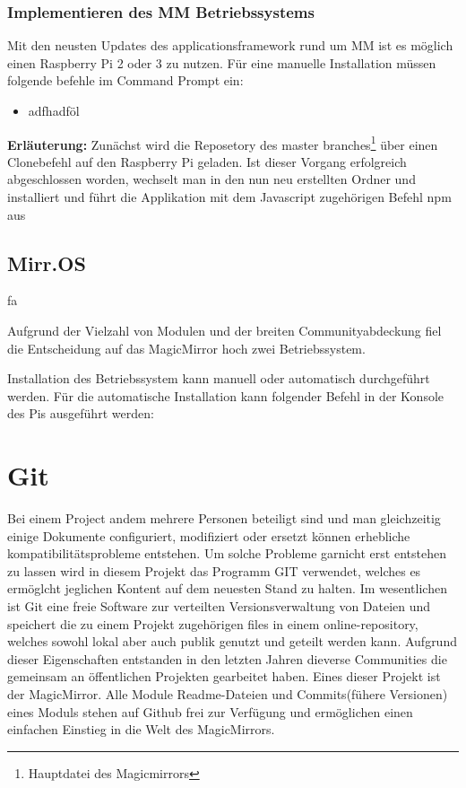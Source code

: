 \documentclass[12pt,a4paper]{report}
\begin{document}
\subsubsection{Implementieren des MM Betriebssystems}
Mit den neusten Updates des applicationsframework rund um MM ist es möglich einen Raspberry Pi 2 oder 3 zu nutzen. Für eine manuelle Installation müssen folgende befehle im Command Prompt ein:
 
 \begin{itemize}
 \item adfhadföl
 \end{itemize}
\textbf{Erläuterung:}
Zunächst wird die Reposetory des master branches\footnote{Hauptdatei des Magicmirrors} über einen Clonebefehl auf den Raspberry Pi geladen. Ist dieser Vorgang erfolgreich abgeschlossen worden, wechselt man in den nun neu erstellten Ordner und installiert und führt die Applikation mit dem Javascript zugehörigen Befehl npm aus 

\subsection*{Mirr.OS}
fa


Aufgrund der Vielzahl von Modulen und der breiten Communityabdeckung fiel die Entscheidung auf das MagicMirror hoch zwei Betriebssystem. 


Installation des Betriebssystem kann manuell oder automatisch durchgeführt werden. 
Für die automatische Installation kann folgender Befehl in der Konsole des Pis ausgeführt werden:

\section{Git}
Bei einem Project andem mehrere Personen beteiligt sind und man gleichzeitig einige Dokumente configuriert, modifiziert oder ersetzt können erhebliche kompatibilitätsprobleme entstehen. Um solche Probleme garnicht erst entstehen zu lassen wird in diesem Projekt das Programm GIT verwendet, welches es ermöglcht jeglichen Kontent auf dem neuesten Stand zu halten. Im wesentlichen ist Git eine freie Software zur verteilten Versionsverwaltung von Dateien und speichert die zu einem Projekt zugehörigen files in einem online-repository, welches sowohl lokal aber auch publik genutzt und geteilt werden kann. Aufgrund dieser Eigenschaften entstanden in den letzten Jahren dieverse Communities die gemeinsam an öffentlichen Projekten gearbeitet haben. Eines dieser Projekt ist der MagicMirror. Alle Module Readme-Dateien und Commits(fühere Versionen) eines Moduls stehen auf Github frei zur Verfügung und ermöglichen einen einfachen Einstieg in die Welt des MagicMirrors.
\end{document}
